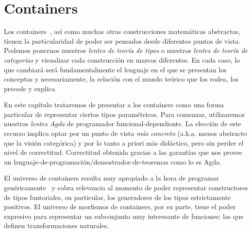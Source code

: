 \chapter{Containers}\label{cont}

\begin{epigraphs}
\end{epigraphs}


Los containers~\cite{abbott:2003,alti:2005}, así como muchas otras construcciones matemáticas abstractas, tienen la particularidad de poder ser pensados desde diferentes puntos de vista. Podemos ponernos nuestros {\it lentes de teoría de tipos} o nuestros {\it lentes de teoría de categorías} y visualizar cada construcción en marcos diferentes. En cada caso, lo que cambiará será fundamentalmente el lenguaje en el que se presentan los conceptos y necesariamente, la relación con el mundo teórico que los rodea, los precede y explica.

En este capítulo trataremos de presentar a los containers como una forma particular de representar ciertos tipos paramétricos. Para comenzar, utilizaremos nuestros {\it lentes Agda} de programador funcional-dependiente. La elección de este recurso implica optar por un punto de vista {\it más concreto} (a.k.a. menos abstracto que la visión categórica) y por lo tanto a priori más didáctico, pero sin perder el nivel de correctitud. Correctitud obtenida gracias a las garantías que nos provee un lenguaje-de-programación/demostrador-de-teoremas como lo es Agda.

El universo de containers resulta muy apropiado a la hora de programar genéricamente~\cite{alti:2007} y cobra relevancia al momento de poder representar constructores de tipos funtoriales, en particular, los generadores de los tipos estrictamente positivos. El universo de morfismos de containers, por su parte, tiene el poder expresivo para representar un subconjunto muy interesante de funciones: las que definen transformaciones naturales.

